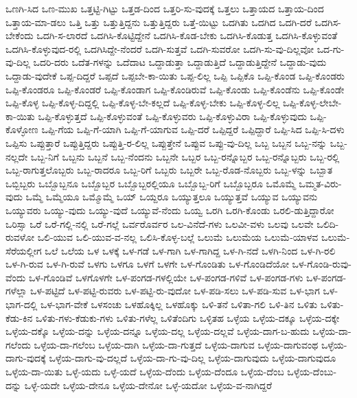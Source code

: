 {ಒಣಗಿ-ಸಿದ
ಒಣ-ಮುಖ
ಒತ್ತಟ್ಟಿ-ಗಿಟ್ಟು
ಒತ್ತಡ-ದಿಂದ
ಒತ್ತರಿ-ಸು-ವುದಕ್ಕೆ
ಒತ್ತಲು
ಒತ್ತಾಯದ
ಒತ್ತಾಯ-ದಿಂದ
ಒತ್ತಾಯ-ಮಾ-ಡಲು
ಒತ್ತಿ
ಒತ್ತು
ಒತ್ತುತ್ತಿದ್ದನು
ಒತ್ತುತ್ತಿದ್ದರು
ಒತ್ತೆ-ಯಿಟ್ಟು
ಒದಗಿತು
ಒದಗಿದ
ಒದಗಿ-ದರೆ
ಒದಗಿಸ-ಬೇಕೆಂದು
ಒದಗಿ-ಸ-ಲಾರದೆ
ಒದಗಿಸಿ-ಕೊಟ್ಟಿದ್ದೇನೆ
ಒದಗಿಸಿ-ಕೊಡ-ಬೇಕು
ಒದಗಿಸಿ-ಕೊಡುತ್ತ
ಒದಗಿಸಿ-ಕೊಳ್ಳುವಂತೆ
ಒದಗಿಸಿ-ಕೊಳ್ಳುವುದ-ರಲ್ಲಿ
ಒದಗಿಸಿದ್ದೇ-ನೆಂದರೆ
ಒದಗಿ-ಸುತ್ತವೆ
ಒದಗಿ-ಸುವರೋ
ಒದಗಿ-ಸು-ವು-ದಿಲ್ಲವೋ
ಒದ-ಗು-ವು-ದಿಲ್ಲ
ಒದರಿ-ದರು
ಒದೆತ-ಗಳನ್ನು
ಒದೆದಾಟ
ಒದ್ದಾಡುತ್ತಾ
ಒದ್ದಾಡುತ್ತಿದೆ
ಒದ್ದಾಡುತ್ತಿದ್ದೇನೆ
ಒದ್ದಾಡು-ವುದು
ಒದ್ದಾಡು-ವುದೇಕೆ
ಒಪ್ಪ-ದಿದ್ದರೆ
ಒಪ್ಪದೆ
ಒಪ್ಪಬೇ-ಕಾ-ಯಿತು
ಒಪ್ಪ-ಲಿಲ್ಲ
ಒಪ್ಪಿ
ಒಪ್ಪಿಕೊ
ಒಪ್ಪಿ-ಕೊಂಡ
ಒಪ್ಪಿ-ಕೊಂಡರು
ಒಪ್ಪಿ-ಕೊಂಡರೂ
ಒಪ್ಪಿ-ಕೊಂಡರೆ
ಒಪ್ಪಿ-ಕೊಂಡಾಗ
ಒಪ್ಪಿ-ಕೊಂಡಿರುವೆ
ಒಪ್ಪಿ-ಕೊಂಡು
ಒಪ್ಪಿ-ಕೊಂಡೆನು
ಒಪ್ಪಿ-ಕೊಂಡೇ
ಒಪ್ಪಿ-ಕೊಳ್ಳ
ಒಪ್ಪಿ-ಕೊಳ್ಳ-ದಿದ್ದಲ್ಲಿ
ಒಪ್ಪಿ-ಕೊಳ್ಳ-ಬೇ-ಕಲ್ಲದೆ
ಒಪ್ಪಿ-ಕೊಳ್ಳ-ಬೇಕು
ಒಪ್ಪಿ-ಕೊಳ್ಳ-ಲಿಲ್ಲ
ಒಪ್ಪಿ-ಕೊಳ್ಳ-ಲೇಬೇ-ಕಾ-ಯಿತು
ಒಪ್ಪಿ-ಕೊಳ್ಳುತ್ತದೆ
ಒಪ್ಪಿ-ಕೊಳ್ಳುವಂತೆ
ಒಪ್ಪಿ-ಕೊಳ್ಳುವರು
ಒಪ್ಪಿ-ಕೊಳ್ಳುವಿರಾ
ಒಪ್ಪಿ-ಕೊಳ್ಳುವುದು
ಒಪ್ಪಿ-ಕೊಳ್ಳೋಣ
ಒಪ್ಪಿ-ಗೆಯ
ಒಪ್ಪಿ-ಗೆ-ಯಾಗಿ
ಒಪ್ಪಿ-ಗೆ-ಯಾಗುವ
ಒಪ್ಪಿ-ದರೆ
ಒಪ್ಪಿದ್ದರೆ
ಒಪ್ಪಿದ್ದಾರೆ
ಒಪ್ಪಿ-ಸಿದ
ಒಪ್ಪಿ-ಸಿ-ದಳು
ಒಪ್ಪಿಸು
ಒಪ್ಪುತ್ತಾರೆ
ಒಪ್ಪುತ್ತಿದ್ದರು
ಒಪ್ಪುತ್ತಿ-ರ-ಲಿಲ್ಲ
ಒಪ್ಪುತ್ತೇನೆ
ಒಪ್ಪುವ
ಒಪ್ಪು-ವು-ದಿಲ್ಲ
ಒಬ್ಬ
ಒಬ್ಬನ
ಒಬ್ಬ-ನನ್ನು
ಒಬ್ಬ-ನಲ್ಲದೇ
ಒಬ್ಬ-ನಿಗೆ
ಒಬ್ಬನು
ಒಬ್ಬನೆ
ಒಬ್ಬ-ನೆಂದನು
ಒಬ್ಬನೇ
ಒಬ್ಬರ
ಒಬ್ಬ-ರನ್ನೊಬ್ಬರ
ಒಬ್ಬ-ರನ್ನೊಬ್ಬರು
ಒಬ್ಬ-ರಲ್ಲಿ
ಒಬ್ಬ-ರಾಗುತ್ತಲೊಬ್ಬರು
ಒಬ್ಬ-ರಾದರೂ
ಒಬ್ಬ-ರಿಗೆ
ಒಬ್ಬರು
ಒಬ್ಬರೇ
ಒಬ್ಬ-ರೊಡ-ನೊಬ್ಬರು
ಒಬ್ಬ-ಳನ್ನು
ಒಬ್ಬಾತ
ಒಬ್ಬಿಬ್ಬರು
ಒಬ್ಬೊಬ್ಬನೂ
ಒಬ್ಬೊಬ್ಬರ
ಒಬ್ಬೊಬ್ಬರಲ್ಲಿಯೂ
ಒಬ್ಬೊಬ್ಬ-ರಿಗೆ
ಒಬ್ಬೊಬ್ಬರೂ
ಒಮೊಮ್ಮೆ
ಒಮ್ಮತ-ವಿರು-ವುದು
ಒಮ್ಮೆ
ಒಮ್ಮೆಯೂ
ಒಮ್ಮೊಮ್ಮೆ
ಒಯ್
ಒಯ್ದರೂ
ಒಯ್ಯುತ್ತಲೂ
ಒಯ್ಯುತ್ತವೆ
ಒಯ್ಯುವ
ಒಯ್ಯುವನು
ಒಯ್ಯುವರು
ಒಯ್ಯು-ವುದು
ಒಯ್ಯು-ವುದೆ
ಒಯ್ಯುವೆ-ನೆಂದು
ಒಯ್ವ
ಒರಗಿ
ಒರಗಿ-ಕೊಂಡು
ಒರಲಿ-ಡುತ್ತಿದ್ದಾರೋ
ಒರಿಸ್ಸಾ
ಒರೆ
ಒರೆ-ಗಲ್ಲಿ-ನಲ್ಲಿ
ಒರೆ-ಗಲ್ಲೆ
ಒರ್ವರೊರ್ವರ
ಒಲ-ವಿನೆದೆ-ಗಳು
ಒಲವೀ-ವಳು
ಒಲವು
ಒಲವೇ
ಒಲಿದಿ-ರುವಳೋ
ಒಲಿ-ಯುವ
ಒಲಿ-ಯುವ-ವ-ನಲ್ಲ
ಒಲಿಸಿ-ಕೊಳ್ಳ-ಬಲ್ಲೆ
ಒಲುಮೆ
ಒಲುಮೆಯ
ಒಲುಮೆ-ಯಾಳವ
ಒಲುಮೆ-ಸೆರೆಯಲ್ಲೀಗ
ಒಲೆ
ಒಲೆಯ
ಒಳ
ಒಳಕ್ಕೆ
ಒಳ-ಗಡೆ
ಒಳ-ಗಾಗಿ
ಒಳ-ಗಾಗಿದ್ದ
ಒಳ-ಗಿ-ನದೆ
ಒಳಗಿ-ನಿಂದ
ಒಳ-ಗಿ-ರಲಿ
ಒಳ-ಗಿ-ರುವ
ಒಳ-ಗಿ-ರುವೆ
ಒಳಗು
ಒಳಗೂ
ಒಳಗೆ
ಒಳಗೇ
ಒಳ-ಗೊಂಡಿತು
ಒಳ-ಗೊಂಡಿದೆಯೋ
ಒಳ-ಗೊಂಡಿ-ರುವು-ವೆಂದು
ಒಳ-ಗೊಂಡಿವೆ
ಒಳಗೊಳಗೇ
ಒಳ-ಪಂಗಡ-ಗಳಲ್ಲಿಯೇ
ಒಳ-ಪಂಗಡ-ಗಳಿವೆ
ಒಳ-ಪಂಗಡ-ಗಳು
ಒಳ-ಪಂಗಡ-ಗಳೆಲ್ಲಾ
ಒಳ-ಪಟ್ಟಿದೆ
ಒಳ-ಪಟ್ಟಿ-ರುವರು
ಒಳ-ಪಟ್ಟಿ-ರು-ವುದೋ
ಒಳ-ಪಡಿ-ಸಲು
ಒಳ-ಪಡಿ-ಸುವ
ಒಳ-ಭಾಗ
ಒಳ-ಭಾಗ-ದಲ್ಲಿ
ಒಳ-ಭಾಗ-ವೇಕೆ
ಒಳಸಂಚು
ಒಳಹೊಕ್ಕಿಲ್ಲ
ಒಳಹೊಕ್ಕು
ಒಳಿ-ತನೆ
ಒಳಿತಾ-ಗಲಿ
ಒಳಿ-ತಿನ
ಒಳಿತು
ಒಳಿತು-ಕೆಡು-ಕಿನ
ಒಳಿತು-ಗಳು-ಕೆಡುಕು-ಗಳು
ಒಳಿತು-ಗಳೆಲ್ಲ
ಒಳಿತೆಂದಿಗು
ಒಳ್ಳಿತಹ
ಒಳ್ಳೆಯ
ಒಳ್ಳೆಯ-ದಕ್ಕೂ
ಒಳ್ಳೆಯ-ದಕ್ಕೇ
ಒಳ್ಳೆಯ-ದಕ್ಕೊ
ಒಳ್ಳೆಯ-ದನ್ನು
ಒಳ್ಳೆಯ-ದನ್ನೂ
ಒಳ್ಳೆಯ-ದಲ್ಲ
ಒಳ್ಳೆಯ-ದಲ್ಲವೆ
ಒಳ್ಳೆಯ-ದಾಗ-ಬ-ಹುದು
ಒಳ್ಳೆಯ-ದಾ-ಗಲೆಂದು
ಒಳ್ಳೆಯ-ದಾ-ಗಲೆಂಬ
ಒಳ್ಳೆಯ-ದಾಗಿ
ಒಳ್ಳೆಯ-ದಾ-ಗುತ್ತದೆ
ಒಳ್ಳೆಯ-ದಾಗುವ
ಒಳ್ಳೆಯ-ದಾಗುವಂಥ
ಒಳ್ಳೆಯ-ದಾಗು-ವುದಕ್ಕೆ
ಒಳ್ಳೆಯ-ದಾಗು-ವು-ದಲ್ಲದೆ
ಒಳ್ಳೆಯ-ದಾ-ಗು-ವು-ದಿಲ್ಲ
ಒಳ್ಳೆಯ-ದಾಗುವುದು
ಒಳ್ಳೆಯ-ದಾಗುವುದೂ
ಒಳ್ಳೆಯ-ದಾ-ಯಿತು
ಒಳ್ಳೆ-ಯದು
ಒಳ್ಳೆ-ಯದೆ
ಒಳ್ಳೆಯ-ದೆಂದು
ಒಳ್ಳೆಯ-ದೆಂದೂ
ಒಳ್ಳೆಯ-ದೆಂಬ
ಒಳ್ಳೆಯ-ದೆಂಬು-ದನ್ನು
ಒಳ್ಳೆ-ಯದೇ
ಒಳ್ಳೆಯ-ದೇನೂ
ಒಳ್ಳೆಯ-ದೇನೋ
ಒಳ್ಳೆ-ಯದೋ
ಒಳ್ಳೆಯ-ವ-ನಾಗಿದ್ದರೆ
}
